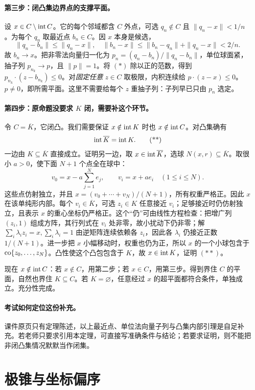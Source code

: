 \paragraph{第三步：闭凸集边界点的支撑平面。}
设 $x\in C\setminus\operatorname{int} C$。它的每个邻域都含 $C$ 外点，可选 $q_n\notin C$ 且 $\|q_n-x\|<1/n$。为每个 $q_n$ 取最近点 $b_n\in C$。因 $x$ 本身是候选，
\[\|q_n-b_n\|\le\|q_n-x\|,
\quad\|b_n-x\|\le\|b_n-q_n\|+\|q_n-x\|<2/n.
\]
故 $b_n\to x$。把非零法向量归一化为 $p_n=(q_n-b_n)/\|q_n-b_n\|$，单位球面紧，抽子列 $p_{n_k}\to p$，且 $\|p\|=1$。将 $(*)$ 除以正的范数，得到 $p_{n_k}\cdot(z-b_{n_k})\le0$。对\emph{固定任意} $z\in C$ 取极限，内积连续给 $p\cdot(z-x)\le0$。$p\ne0$，即所需平面。这里不需要给每个 $z$ 重抽子列：子列早已只由 $p_n$ 选定。

\paragraph{第四步：原命题没要求 $K$ 闭，需要补这个环节。}
令 $C=\overline K$，它闭凸。我们需要保证 $x\notin\operatorname{int} K$ 时也 $x\notin\operatorname{int} C$。对凸集确有
\[\operatorname{int}\overline K=\operatorname{int} K.\tag{**}
\]
一边由 $K\subseteq\overline K$ 直接成立。证明另一边，取 $x\in\operatorname{int}\overline K$，选球 $N(x,r)\subseteq\overline K$。取很小 $a>0$，使下面 $N+1$ 个点全在球中：
\[v_0=x-a\sum_{j=1}^Ne_j,\qquad v_i=x+ae_i\quad(1\le i\le N).
\]
这些点仿射独立，并且 $x=(v_0+\cdots+v_N)/(N+1)$，所有权重严格正。因此 $x$ 在该单纯形内部。每个 $v_i\in\overline K$，可选 $z_i\in K$ 任意接近 $v_i$；足够接近时仍仿射独立，且表示 $x$ 的重心坐标仍严格正。这个“仍”可由线性方程检查：把增广列 $(z_i,1)$ 组成方阵，其行列式在 $v_i$ 处非零，故小扰动下仍非零；解 $\sum_i\lambda_i z_i=x,\sum_i\lambda_i=1$ 由逆矩阵连续依赖各 $z_i$，因此各 $\lambda_i$ 仍接近正数 $1/(N+1)$。进一步把 $x$ 小幅移动时，权重也仍为正，所以 $x$ 的一个小球包含于 $\operatorname{co}\{z_0,\ldots,z_N\}$。凸性使这个凸包包含于 $K$，故 $x\in\operatorname{int} K$，证明 $(**)$。

现在 $x\notin\operatorname{int} C$：若 $x\notin C$，用第二步；若 $x\in C$，用第三步。得到界住 $C$ 的平面，自然也界住 $K\subseteq C$。若 $K=\varnothing$，任意经过 $x$ 的超平面都符合条件，单独成立。充分性完成。

\paragraph{考试如何定位这份补充。}
课件原页只有定理陈述，以上最近点、单位法向量子列与凸集内部引理是自足补充。若老师只要求引用本定理，可直接写准确条件与结论；若要求证明，则不能把非闭凸集情况默默当作闭集。


\clearpage\section{极锥与坐标偏序}\label{g:109:65}

